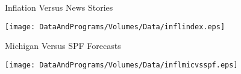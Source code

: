 \begin{figure}
 \caption{}
 \centerline{Inflation Versus News Stories}\medskip\medskip\medskip
 \centerline{\texttt{[image: DataAndPrograms/Volumes/Data/inflindex.eps]}}%
 \label{fig:inflfigs}
\end{figure}

\pagebreak\vfill\eject

\begin{figure}
 \caption{}
 \centerline{Michigan Versus SPF Forecasts}
 \centerline{\texttt{[image: DataAndPrograms/Volumes/Data/inflmicvsspf.eps]}}%
\end{figure}

